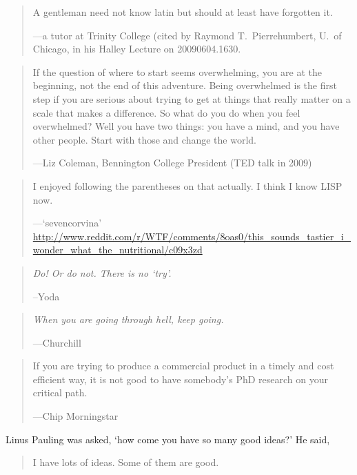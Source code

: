 \documentclass[a4paper]{article}
\begin{document}
\medskip
\begin{quote}
	A gentleman need not know latin but should at least have
	forgotten it.

	---a tutor at Trinity College (cited by Raymond T.~Pierrehumbert,
	U.~of Chicago, in his Halley Lecture on 20090604.1630.
\end{quote}

\medskip
\begin{quote}
	If the question of where to start seems overwhelming, you are
	at the beginning, not the end of this adventure.
	Being overwhelmed is the first step if you are serious about
	trying to get at things that really matter on a scale that
	makes a difference.  So what do you do when you feel overwhelmed?
	Well you have two things: you have a mind, and you have other
	people.  Start with those and change the world.

	---Liz Coleman, Bennington College President (TED talk in 2009)
\end{quote}

\medskip
\begin{quote}
	I enjoyed following the parentheses on that actually. I think I
	know LISP now.

	---`sevencorvina'
	\url{http://www.reddit.com/r/WTF/comments/8oas0/this_sounds_tastier_i_wonder_what_the_nutritional/c09x3zd}
\end{quote}

\medskip
\begin{quote}
	\emph{Do!  Or do not.  There is no `try'.}

	--Yoda
\end{quote}

\medskip
\begin{quote}
	\emph{When you are going through hell, keep going.}

	---Churchill
\end{quote}

\medskip
\begin{quote}
	If you are trying to produce a commercial product in a timely
	and cost efficient way, it is not good to have somebody's PhD
	research on your critical path.

	---Chip Morningstar~\citep{Morningstar2006}
\end{quote}

\medskip
Linus Pauling was asked, `how come you have so many good ideas?'
He said,
\begin{quote}
	I have lots of ideas.  Some of them are good.
\end{quote}
\end{document}
